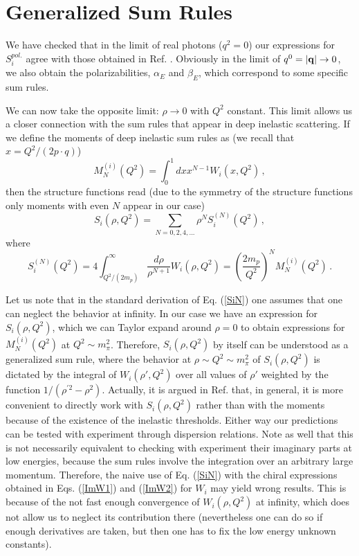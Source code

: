 \documentclass[a4paper,12pt]{article}
\newcommand{\be}{\begin{equation}}
\newcommand{\ee}{\end{equation}}
\begin{document}
\section{Generalized Sum Rules}

We have checked that in the limit of real photons ($q^2=0$) our expressions 
for $S_i^{pol.}$ agree with those obtained in Ref. \cite{Bernard:1992qa}.  Obviously in the 
 limit of $q^0=|{\bf q}| \rightarrow 0$, we also obtain the polarizabilities, $\alpha_E$ and 
 $\beta_E$, which  correspond to some specific sum rules. 

We can now take the opposite limit: $\rho \rightarrow 0$ with $Q^2$ constant.
This limit allows us a closer connection with the sum rules that appear in 
deep inelastic scattering. If we define the moments of deep inelastic sum rules as 
(we recall that $x=Q^2/(2p\cdot q)$)
\be
\label{MN}
M_N^{(i)}(Q^2) = \int_0^1 dx x^{N-1} W_i(x,Q^2) 
\,,
\ee
then the structure functions read (due to the 
symmetry of the structure functions only moments with even $N$ 
appear in our case)
\be
S_i(\rho,Q^2)=\sum_{N=0,2,4,...}\rho^NS_i^{(N)}(Q^2)
\,,
\ee
where 
\be
\label{SiN}
S_i^{(N)}(Q^2)=4\int_{Q^2/(2m_p)}^{\infty}\frac{d\rho}{\rho^{N+1}}W_i(\rho,Q^2)
=
\left(\frac{2m_p}{Q^2}\right)^NM_N^{(i)}(Q^2)
\,.
\ee

Let us note that in the standard derivation of Eq. (\ref{SiN}) one assumes that 
one can neglect the behavior at infinity. In our case we have an expression for 
$S_i(\rho,Q^2)$, which we can Taylor expand around $\rho=0$ to obtain expressions 
for $M_N^{(i)}(Q^2)$ at $Q^2 \sim m_{\pi}^2$. Therefore, $S_i(\rho,Q^2)$ by itself 
can be understood as a generalized sum rule, where the behavior 
at $\rho \sim Q^2 \sim m_{\pi}^2$ of $S_i(\rho,Q^2)$ is dictated by the 
integral of $W_i(\rho',Q^2)$ over all values of $\rho'$ weighted by the function $1/(\rho^{\prime 2}-\rho^2)$. 
Actually, it is argued in Ref. \cite{Ji:1999mr} that, in general, it is more convenient to 
directly work with $S_i(\rho,Q^2)$ rather than with the moments because of the 
existence of the inelastic thresholds. Either way our predictions can be tested 
with experiment through dispersion relations. Note as well that this is not necessarily 
 equivalent to checking with experiment their 
imaginary parts at low energies, because the sum rules involve the integration 
over an arbitrary large momentum. Therefore, the naive use of Eq. (\ref{SiN}) with the 
chiral expressions obtained in Eqs. (\ref{ImW1}) and (\ref{ImW2}) for $W_i$ 
may yield wrong results. 
This is because of the not fast enough convergence of $W_i(\rho,Q^2)$ at infinity, which 
does not allow us  to neglect its contribution there (nevertheless 
one can do so if enough derivatives are taken, but then one has to fix the 
low energy unknown constants).
\end{document}
